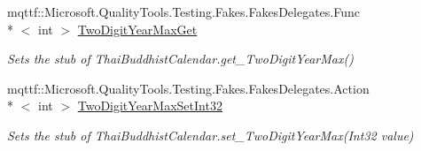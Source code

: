 \begin{DoxyCompactItemize}
mqttf\-::\-Microsoft.\-Quality\-Tools.\-Testing.\-Fakes.\-Fakes\-Delegates.\-Func\\*
$<$ int $>$ \hyperlink{class_system_1_1_globalization_1_1_fakes_1_1_stub_thai_buddhist_calendar_abcc222ee253c7386e9d46de21afd37c3}{Two\-Digit\-Year\-Max\-Get}
\begin{DoxyCompactList}\small\item\em Sets the stub of Thai\-Buddhist\-Calendar.\-get\-\_\-\-Two\-Digit\-Year\-Max()\end{DoxyCompactList}\item 
mqttf\-::\-Microsoft.\-Quality\-Tools.\-Testing.\-Fakes.\-Fakes\-Delegates.\-Action\\*
$<$ int $>$ \hyperlink{class_system_1_1_globalization_1_1_fakes_1_1_stub_thai_buddhist_calendar_ab631a4137f96b98bcd638422f81eec21}{Two\-Digit\-Year\-Max\-Set\-Int32}
\begin{DoxyCompactList}\small\item\em Sets the stub of Thai\-Buddhist\-Calendar.\-set\-\_\-\-Two\-Digit\-Year\-Max(\-Int32 value)\end{DoxyCompactList}\end{DoxyCompactItemize}
